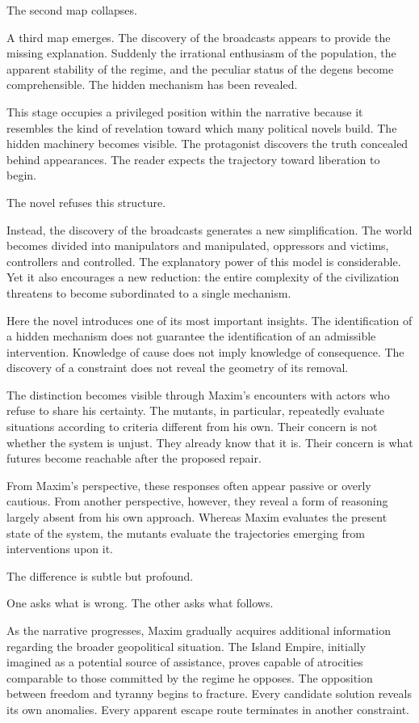 \documentclass[12pt, a4paper]{article}
\theoremstyle{plain}
\theoremstyle{definition}
\theoremstyle{remark}
\begin{document}
The second map collapses.

A third map emerges. The discovery of the
broadcasts appears to provide the missing
explanation. Suddenly the irrational enthusiasm
of the population, the apparent stability of the
regime, and the peculiar status of the degens
become comprehensible. The hidden mechanism has
been revealed.

This stage occupies a privileged position within
the narrative because it resembles the kind of
revelation toward which many political novels
build. The hidden machinery becomes visible.
The protagonist discovers the truth concealed
behind appearances. The reader expects the
trajectory toward liberation to begin.

The novel refuses this structure.

Instead, the discovery of the broadcasts generates
a new simplification. The world becomes divided
into manipulators and manipulated, oppressors and
victims, controllers and controlled. The
explanatory power of this model is considerable.
Yet it also encourages a new reduction: the entire
complexity of the civilization threatens to become
subordinated to a single mechanism.

Here the novel introduces one of its most important
insights. The identification of a hidden mechanism
does not guarantee the identification of an
admissible intervention. Knowledge of cause does
not imply knowledge of consequence. The discovery
of a constraint does not reveal the geometry of
its removal.

The distinction becomes visible through Maxim's
encounters with actors who refuse to share his
certainty. The mutants, in particular, repeatedly
evaluate situations according to criteria different
from his own. Their concern is not whether the
system is unjust. They already know that it is.
Their concern is what futures become reachable
after the proposed repair.

From Maxim's perspective, these responses often
appear passive or overly cautious. From another
perspective, however, they reveal a form of
reasoning largely absent from his own approach.
Whereas Maxim evaluates the present state of the
system, the mutants evaluate the trajectories
emerging from interventions upon it.

The difference is subtle but profound.

One asks what is wrong.
The other asks what follows.

As the narrative progresses, Maxim gradually
acquires additional information regarding the
broader geopolitical situation. The Island Empire,
initially imagined as a potential source of
assistance, proves capable of atrocities comparable
to those committed by the regime he opposes.
The opposition between freedom and tyranny begins
to fracture. Every candidate solution reveals its
own anomalies. Every apparent escape route
terminates in another constraint.
\end{document}
